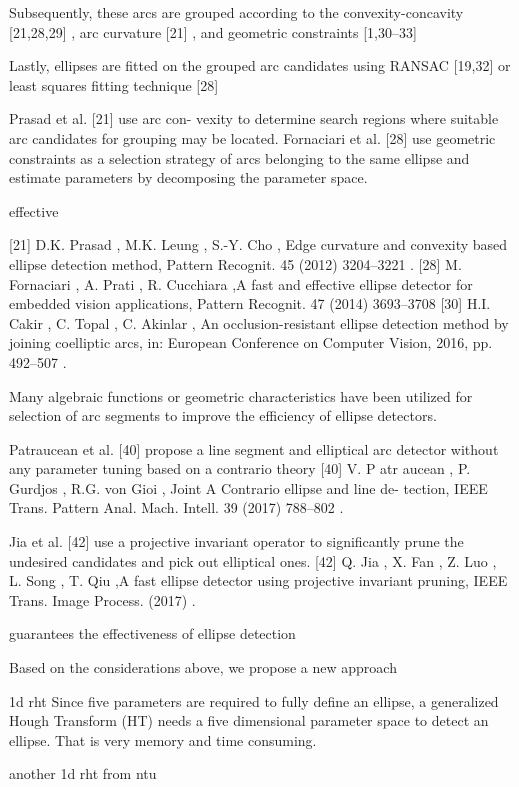 \documentclass[a4paper]{report}
\begin{document}
Subsequently, these arcs are grouped according to the convexity-concavity [21,28,29] , arc curvature [21] , and geometric constraints [1,30–33] 

Lastly, ellipses are fitted on the grouped arc candidates using RANSAC [19,32] or least squares fitting technique [28]

Prasad et al. [21] use arc con- vexity to determine search regions where suitable arc candidates for grouping may be located. Fornaciari et al. [28] use geometric constraints as a selection strategy of arcs belonging to the same ellipse and estimate parameters by decomposing the parameter space.

effective

[21] D.K. Prasad , M.K. Leung , S.-Y. Cho , Edge curvature and convexity based ellipse detection method, Pattern Recognit. 45 (2012) 3204–3221 .
[28] M. Fornaciari , A. Prati , R. Cucchiara ,A fast and effective ellipse detector for embedded vision applications, Pattern Recognit. 47 (2014) 3693–3708
[30] H.I. Cakir , C. Topal , C. Akinlar , An occlusion-resistant ellipse detection method by joining coelliptic arcs, in: European Conference on Computer Vision, 2016, pp. 492–507 .


Many algebraic functions or geometric characteristics have been utilized for selection of arc segments to improve the efficiency of ellipse detectors.

Patraucean et al. [40] propose a line segment and elliptical arc detector without any parameter tuning based on a contrario theory
[40] V. P atr aucean , P. Gurdjos , R.G. von Gioi , Joint A Contrario ellipse and line de- tection, IEEE Trans. Pattern Anal. Mach. Intell. 39 (2017) 788–802 .

Jia et al. [42] use a projective invariant operator to significantly prune the undesired candidates and pick out elliptical ones. 
[42] Q. Jia , X. Fan , Z. Luo , L. Song , T. Qiu ,A fast ellipse detector using projective invariant pruning, IEEE Trans. Image Process. (2017) .

guarantees the effectiveness of ellipse detection

Based on the considerations above, we propose a new approach




1d rht
Since five parameters are required to fully define an
ellipse, a generalized Hough Transform (HT) needs a five
dimensional parameter space to detect an ellipse. That is very
memory and time consuming.

another 1d rht from ntu
\end{document}
